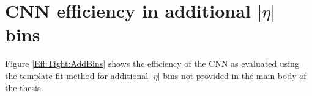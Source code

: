 \section{CNN efficiency in additional $|\eta|$ bins}
Figure \ref{Eff:Tight:AddBins} shows the efficiency of the CNN as evaluated using the template fit method for additional $|\eta|$ bins not provided in the main body of the thesis.
\begin{figure}[ht]
    \centering
	  \\
	

\end{figure}
